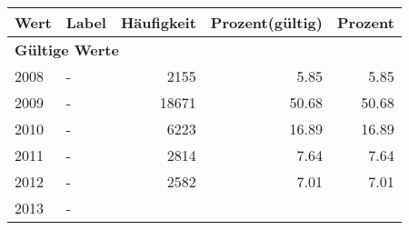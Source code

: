      \begin{longtable}{lXrrr}
     \toprule
     \textbf{Wert} & \textbf{Label} & \textbf{Häufigkeit} & \textbf{Prozent(gültig)} & \textbf{Prozent} \\
     \endhead
     \midrule
     \multicolumn{5}{l}{\textbf{Gültige Werte}}\\

     2008 &
     \multicolumn{1}{X}{ -  } &


       \num{2155} &
       \num[round-mode=places,round-precision=2]{5.85} &
         \num[round-mode=places,round-precision=2]{5.85} \\

     2009 &
     \multicolumn{1}{X}{ -  } &


       \num{18671} &
       \num[round-mode=places,round-precision=2]{50.68} &
         \num[round-mode=places,round-precision=2]{50.68} \\

     2010 &
     \multicolumn{1}{X}{ -  } &


       \num{6223} &
       \num[round-mode=places,round-precision=2]{16.89} &
         \num[round-mode=places,round-precision=2]{16.89} \\

     2011 &
     \multicolumn{1}{X}{ -  } &


       \num{2814} &
       \num[round-mode=places,round-precision=2]{7.64} &
         \num[round-mode=places,round-precision=2]{7.64} \\

     2012 &
     \multicolumn{1}{X}{ -  } &


       \num{2582} &
       \num[round-mode=places,round-precision=2]{7.01} &
         \num[round-mode=places,round-precision=2]{7.01} \\

     2013 &
     \multicolumn{1}{X}{ -  } &



\end{longtable}
